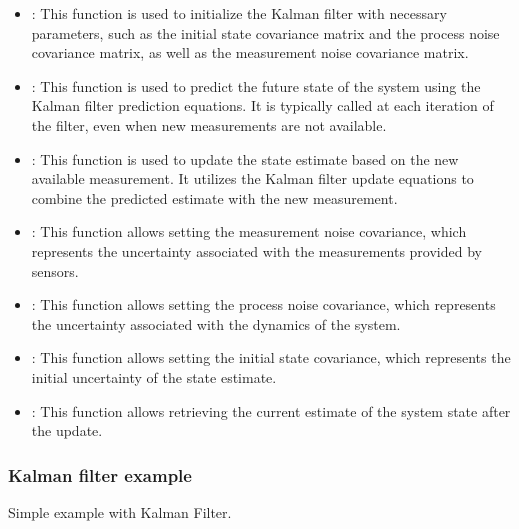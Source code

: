 \begin{itemize}
	\item {}: This function is used to initialize the Kalman filter with necessary parameters, such as the initial state covariance matrix and the process noise covariance matrix, as well as the measurement noise covariance matrix.
	
	\item {}: This function is used to predict the future state of the system using the Kalman filter prediction equations. It is typically called at each iteration of the filter, even when new measurements are not available.
	
	\item {}: This function is used to update the state estimate based on the new available measurement. It utilizes the Kalman filter update equations to combine the predicted estimate with the new measurement.
	
	\item {}: This function allows setting the measurement noise covariance, which represents the uncertainty associated with the measurements provided by sensors.
	
	\item {}: This function allows setting the process noise covariance, which represents the uncertainty associated with the dynamics of the system.
	
	\item {}: This function allows setting the initial state covariance, which represents the initial uncertainty of the state estimate.
	
	\item {}: This function allows retrieving the current estimate of the system state after the update.
	
\end{itemize}

\subsubsection{Kalman filter example}


\begin{code}
	
	
	\caption{Simple example with Kalman Filter.}\label{KalmanFilter.ino}
	
\end{code}
